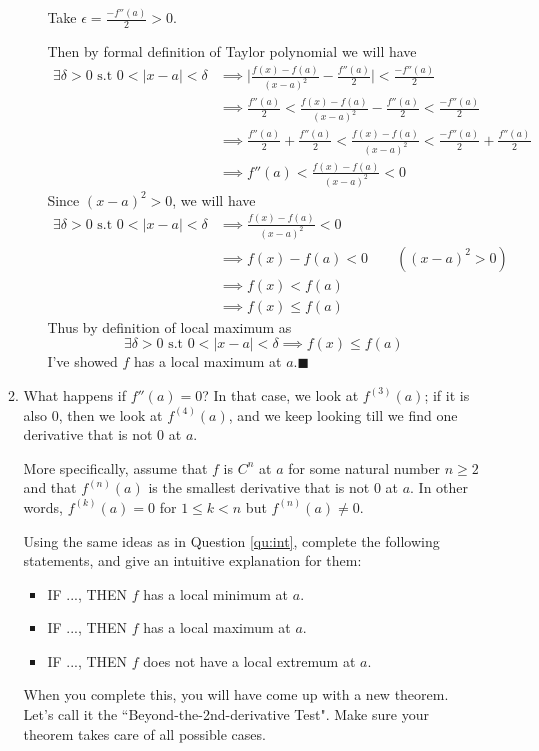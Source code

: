 \documentclass[12pt]{exam}
\begin{document}
\begin{enumerate}
\begin{enumerate}
\begin{itemize}
			        Take $\epsilon=\frac{-f''(a)}{2}>0$.
			        
			        Then by formal definition of Taylor polynomial we will have
			        \begin{align*}
			            \exists\delta>0 \mbox{ s.t } 0<\vert{x-a}\vert<\delta&\implies\vert{\frac{f(x)-f(a)}{(x-a)^2}-\frac{f''(a)}{2}}\vert<\frac{-f''(a)}{2}\\
			            &\implies\frac{f''(a)}{2}<\frac{f(x)-f(a)}{(x-a)^2}-\frac{f''(a)}{2}<\frac{-f''(a)}{2}\\
			            &\implies\frac{f''(a)}{2}+\frac{f''(a)}{2}<\frac{f(x)-f(a)}{(x-a)^2}<\frac{-f''(a)}{2}+\frac{f''(a)}{2}\\
			            &\implies f''(a)<\frac{f(x)-f(a)}{(x-a)^2}<0
			        \end{align*}
			        Since $(x-a)^2>0$, we will have
			        \begin{align*}
			            \exists\delta>0 \mbox{ s.t } 0<\vert{x-a}\vert<\delta
			            &\implies\frac{f(x)-f(a)}{(x-a)^2}<0\\
			            &\implies f(x)-f(a)<0\qquad((x-a)^2>0)\\
			            &\implies f(x)<f(a)\\
			            &\implies f(x)\leq f(a)
			        \end{align*}
			        Thus by definition of local maximum as
			        $$
			            \exists\delta>0 \mbox{ s.t } 0<\vert{x-a}\vert<\delta\implies f(x)\leq f(a)
			        $$
			        I've showed $f$ has a local maximum at $a$.\qquad $\blacksquare$
			\end{itemize}
			
			\newpage
	
		\item \label{qu:conj} What happens if $f''(a)=0$?     In that case, we look at $f^{(3)}(a)$;  if it is also $0$, then we look at $f^{(4)}(a)$, and we keep looking till we find one derivative that is not $0$ at $a$.   
		
		More specifically, assume that $f$ is $C^n$ at $a$ for some natural number $n \geq 2$ and that $f^{(n)}(a)$ is the smallest derivative  that is not $0$ at $a$.   In other words, $f^{(k)}(a) =0$ for $ 1 \leq k < n$ but $f^{(n)}(a) \neq 0$.
		
		Using the same ideas as in Question \ref{qu:int}, complete the following statements, and give an intuitive explanation for them:
			\begin{itemize}
				\item  IF ..., THEN $f$ has a local minimum at $a$.
				\item  IF ..., THEN $f$ has a local maximum at $a$.
				\item  IF ..., THEN $f$ does not have a local extremum at $a$.
			\end{itemize}
		When you complete this, you will have come up with a new theorem.  Let's call it the ``Beyond-the-2nd-derivative Test".   Make sure your theorem takes care of all possible cases.  
		

\end{enumerate}
\end{enumerate}
\end{document}
